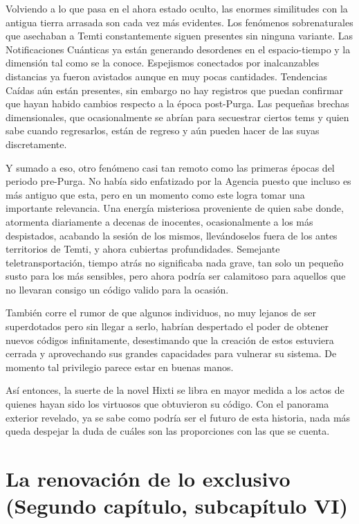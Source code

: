 \documentclass[
  spanish,
]{book}
\begin{document}
Volviendo a lo que pasa en el ahora estado oculto, las enormes similitudes con la antigua tierra arrasada son cada vez más evidentes. Los fenómenos sobrenaturales que asechaban a Temti constantemente siguen presentes sin ninguna variante. Las Notificaciones Cuánticas ya están generando desordenes en el espacio-tiempo y la dimensión tal como se la conoce. Espejismos conectados por inalcanzables distancias ya fueron avistados aunque en muy pocas cantidades. Tendencias Caídas aún están presentes, sin embargo no hay registros que puedan confirmar que hayan habido cambios respecto a la época post-Purga. Las pequeñas brechas dimensionales, que ocasionalmente se abrían para secuestrar ciertos tems y quien sabe cuando regresarlos, están de regreso y aún pueden hacer de las suyas discretamente.

Y sumado a eso, otro fenómeno casi tan remoto como las primeras épocas del periodo pre-Purga. No había sido enfatizado por la Agencia puesto que incluso es más antiguo que esta, pero en un momento como este logra tomar una importante relevancia. Una energía misteriosa proveniente de quien sabe donde, atormenta diariamente a decenas de inocentes, ocasionalmente a los más despistados, acabando la sesión de los mismos, llevándoselos fuera de los antes territorios de Temti, y ahora cubiertas profundidades. Semejante teletransportación, tiempo atrás no significaba nada grave, tan solo un pequeño susto para los más sensibles, pero ahora podría ser calamitoso para aquellos que no llevaran consigo un código valido para la ocasión.

También corre el rumor de que algunos individuos, no muy lejanos de ser superdotados pero sin llegar a serlo, habrían despertado el poder de obtener nuevos códigos infinitamente, desestimando que la creación de estos estuviera cerrada y aprovechando sus grandes capacidades para vulnerar su sistema. De momento tal privilegio parece estar en buenas manos.

Así entonces, la suerte de la novel Hixti se libra en mayor medida a los actos de quienes hayan sido los virtuosos que obtuvieron su código. Con el panorama exterior revelado, ya se sabe como podría ser el futuro de esta historia, nada más queda despejar la duda de cuáles son las proporciones con las que se cuenta.

\hypertarget{la-renovaciuxf3n-de-lo-exclusivo-segundo-capuxedtulo-subcapuxedtulo-vi}{%
\section{La renovación de lo exclusivo (Segundo capítulo, subcapítulo VI)}\label{la-renovaciuxf3n-de-lo-exclusivo-segundo-capuxedtulo-subcapuxedtulo-vi}}
\end{document}
